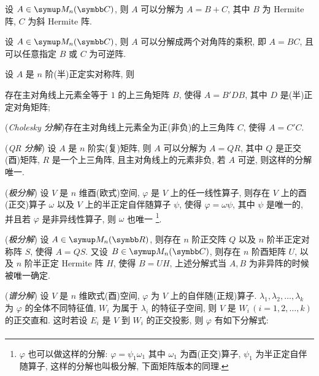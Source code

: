 \documentclass{ctexart}
\begin{document}
    \begin{tcolorbox}[title={矩阵/线性算子分解}]
        \begin{exercise}[resume=exer]
            \item 设 $ A \in \MM[\C] $, 则 $ A $ 可以分解为 $ A = B + C $, 其中 $ B $ 为 Hermite 阵, $ C $ 为斜 Hermite 阵.
            \item 设 $ A\in \MM[\C] $, 则 $ A $ 可以分解成两个对角阵的乘积, 即 $ A = BC $, 且可以任意指定 $ B $ 或 $ C $ 为可逆阵.
            \item 设 $ A $ 是 $ n $ 阶(半)正定实对称阵, 则
            \begin{exercise}
                \item 存在主对角线上元素全等于 $ 1 $ 的上三角矩阵 $ B $, 使得 $ A = B'DB $, 其中 $ D $ 是(半)正定对角矩阵;
                \item (\emph{Cholesky 分解})存在主对角线上元素全为正(非负)的上三角阵 $ C $, 使得 $ A = C'C $. 
            \end{exercise}
            \item (\emph{QR 分解}) 设 $ A $ 是 $ n $ 阶实(复)矩阵, 则 $ A $ 可以分解为 $ A = QR $, 其中 $ Q $ 是正交(酉)矩阵, $ R $ 是一个上三角阵, 且主对角线上的元素非负, 若 $ A $ 可逆, 则这样的分解唯一.
            \item (\emph{极分解}) 设 $ V $ 是 $ n $ 维酉(欧式)空间, $ \varphi $ 是 $ V $ 上的任一线性算子, 则存在 $ V $ 上的酉(正交)算子 $ \omega $ 以及 $ V $ 上的半正定自伴随算子 $ \psi $, 使得 $ \varphi = \omega\psi $, 其中 $ \psi $ 是唯一的, 并且若 $ \varphi $ 是非异线性算子, 则 $ \omega $ 也唯一 \footnote{ $ \varphi $ 也可以做这样的分解: $ \varphi = \psi_{1}\omega_{1} $ 其中 $ \omega_{1} $ 为酉(正交)算子, $ \psi_{1} $ 为半正定自伴随算子, 这样的分解也叫极分解, 下面矩阵版本的同理.}. 
            \item \label{item:矩阵极分解}(\emph{极分解}) 设 $ A \in \MM $, 则存在 $ n $ 阶正交阵 $ Q $ 以及 $ n $ 阶半正定对称阵 $ S $, 使得 $ A = QS $. 又设 $ B \in \MM[\C] $, 则存在 $ n $ 阶酉矩阵 $ U $, 以及 $ n $ 阶半正定 Hermite 阵 $ H $, 使得 $ B = UH $, 上述分解式当 $ A, B $ 为非异阵的时候被唯一确定.
            \item (\emph{谱分解}) 设 $ V $ 是 $ n $ 维欧式(酉)空间, $ \varphi $ 为 $ V $ 上的自伴随(正规)算子. $ \lambda_{1}, \lambda_{2}, \dots, \lambda_{k} $ 为 $ \varphi $ 的全体不同特征值, $ W_{i} $ 为属于 $ \lambda_{i} $ 的特征子空间, 则 $ V $ 是 $ W_{i}\,(i = 1, 2, \dots, k) $ 的正交直和. 这时若设 $ E_{i} $ 是 $ V $ 到 $ W_{i} $ 的正交投影, 则 $ \varphi $ 有如下分解式:
            \begin{align*}

\end{align*}
\end{exercise}
\end{tcolorbox}
\end{document}
